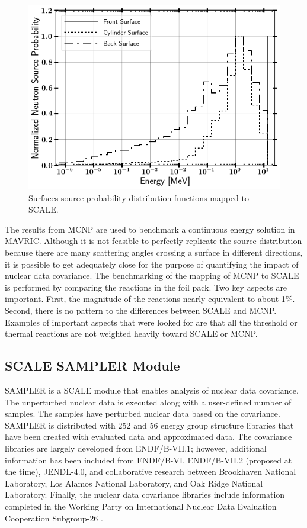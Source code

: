 \begin{figure}[ht]
	\includegraphics[width=\linewidth]{Figures/Chapter3/RSSA_Spectrum.png}
	\caption{Surfaces source probability distribution functions mapped to SCALE.}
	\label{fig:RSSASpec}
\end{figure}

The results from MCNP are used to benchmark a continuous energy solution in MAVRIC. 
Although it is not feasible to perfectly replicate the source distribution because there are many scattering angles crossing a surface in different directions, it is possible to get adequately close for the purpose of quantifying the impact of nuclear data covariance. 
The benchmarking of the mapping of MCNP to SCALE is performed by comparing the reactions in the foil pack. 
Two key aspects are important. 
First, the magnitude of the reactions nearly equivalent to about 1\%. %
Second, there is no pattern to the differences between SCALE and MCNP. 
Examples of important aspects that were looked for are that all the threshold or thermal reactions are not weighted heavily toward SCALE or MCNP. 

\subsection{SCALE SAMPLER Module}

SAMPLER is a SCALE module that enables analysis of nuclear data covariance. The unperturbed nuclear data is executed along with a user-defined number of samples. The samples have perturbed nuclear data based on the covariance. 
SAMPLER is distributed with 252 and 56 energy group structure libraries that have been created with evaluated data and approximated data. 
The covariance libraries are largely developed from ENDF/B-VII.1; however, additional information has been included from ENDF/B-VI, ENDF/B-VII.2 (proposed at the time), JENDL-4.0, and collaborative research between Brookhaven National Laboratory, Los Alamos National Laboratory, and Oak Ridge National Laboratory.
Finally, the nuclear data covariance libraries include information completed in the Working Party on International Nuclear Data Evaluation Cooperation Subgroup-26 \cite{SCALE}.

